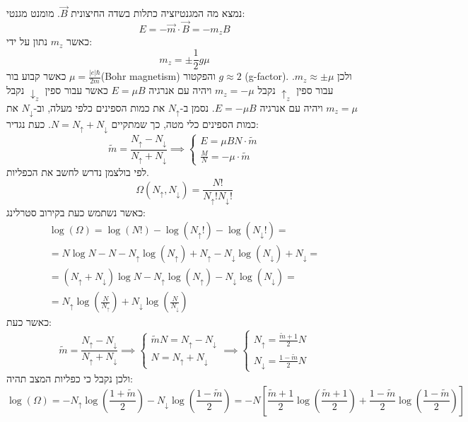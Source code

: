 \documentclass{tstextbook}
\begin{document}
\begin{example}
נמצא מה המגנטיזציה כתלות בשדה החיצונית \(\vec{B}\). מומנט מגנטי:
$$E=-\vec{m}\cdot \vec{B} = -m_{z}{B}$$
כאשר \(m_{z}\) נתון על ידי:
$$m_{z}= \pm \frac{1}{2}g \mu$$
כאשר קבוע בור \(\mu= \frac{|e|\hbar}{2m}\)(Bohr magnetism) והפקטור \(g\approx 2\) (g-factor). ולכן \(m_{z}\approx \pm \mu\).
עבור ספין \(\uparrow_{z}\) נקבל \(m_{z}=-\mu\) ויהיה עם אנרגיה \(E=\mu B\) כאשר עבור ספין \(\downarrow_{z}\) נקבל \(m_{z}=\mu\) ויהיה עם אנרגיה \(E=-\mu B\).
נסמן ב-\(N_{\uparrow}\) את כמות הספינים כלפי מעלה, וב-\(N_{\downarrow}\) את כמות הספינים כלי מטה, כך שמתקיים \(N=N_{\uparrow}+N_{\downarrow}\). כעת נגדיר:
$$\tilde{m}=\frac{N_{\uparrow }-N_{\downarrow }}{N_{\uparrow }+N_{\downarrow }}\implies \begin{cases}E=\mu B N \cdot \tilde{m} \\\frac{M}{N}=-\mu \cdot \tilde{m}
\end{cases}$$
לפי בולצמן נדרש לחשב את הכפליות.
$$\Omega\left( N_{\uparrow },N_{\downarrow } \right)=\frac{N!}{N_{\uparrow }!N_{\downarrow }!}$$
כאשר נשתמש כעת בקירוב סטרלינג:
\begin{gather*}\log\left( \Omega \right)=\log(N!)-\log\left( N_{\uparrow }! \right) - \log\left( N_{\downarrow }! \right)= \\= N \log N - N -N_{\uparrow }\log\left( N_{\uparrow } \right)+N_{\uparrow }-N_{\downarrow }\log\left( N_{\downarrow } \right)+N_{\downarrow }=  \\=\left( N_{\uparrow }+N_{\downarrow } \right) \log N -N_{\uparrow }\log\left( N_{\uparrow } \right)-N_{\downarrow }\log\left( N_{\downarrow } \right)= \\=N_{\uparrow }\log\left( \frac{N}{N_{\uparrow }} \right)+N_{\downarrow }\log\left( \frac{N}{N_{\downarrow }} \right)
\end{gather*}
כאשר כעת:
$$\tilde{m}= \frac{N_{\uparrow }-N_{\downarrow }}{N_{\uparrow }+N_{\downarrow }}\implies \begin{cases} \tilde{m}N = N_{\uparrow }-N_{\downarrow } \\N= N_{\uparrow }+N_{\downarrow }\end{cases}\implies  \begin{cases}N_{\uparrow }= \frac{\tilde{m} + 1}{2} N \\N_{\downarrow }= \frac{1 - \tilde{m}}{2} N
\end{cases}$$
ולכן נקבל כי כפליות המצב תהיה:
$$\log\left( \Omega \right)=-N_{\uparrow }\log\left( \frac{1+\tilde{m}}{2} \right)-N_{\downarrow }\log\left( \frac{1-\tilde{m}}{2} \right)=-N\left[ \frac{\tilde{m}+1}{2}\log\left( \frac{\tilde{m}+1}{2} \right)+\frac{1-\tilde{m}}{2} \log\left( \frac{1-\tilde{m}}{2} \right)\right]$$

\end{example}
\end{document}
